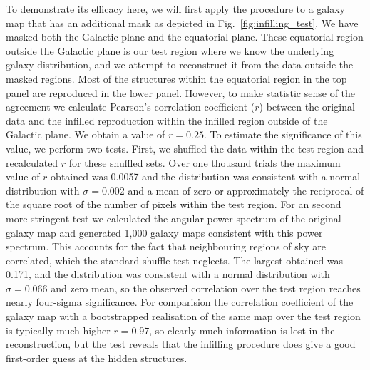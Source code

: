 \documentclass[useAMS,usenatbib]{mn2e}
\begin{document}
To demonstrate its efficacy here, we will first apply the procedure to
a galaxy map that has an additional mask as depicted in
Fig.~\ref{fig:infilling_test}.  We have masked both the Galactic plane
and the equatorial plane.  These equatorial region outside the
Galactic plane is our test region where we know the underlying galaxy
distribution, and we attempt to reconstruct it from the data outside
the masked regions.  Most of the structures within the equatorial
region in the top panel are reproduced in the lower panel.  However,
to make statistic sense of the agreement we calculate Pearson's
correlation coefficient ($r$) between the original data and the
infilled reproduction within the infilled region outside of the
Galactic plane.  We obtain a value of $r=0.25$.  To estimate the
significance of this value, we perform two tests.  First, we shuffled
the data within the test region and recalculated $r$ for these
shuffled sets.  Over one thousand trials the maximum value of $r$
obtained was 0.0057 and the distribution was consistent with a normal
distribution with $\sigma=0.002$ and a mean of zero or approximately
the reciprocal of the square root of the number of pixels within the
test region.  For an second more stringent test we calculated the
angular power spectrum of the original galaxy map and generated 1,000
galaxy maps consistent with this power spectrum.  This accounts for
the fact that neighbouring regions of sky are correlated, which the
standard shuffle test neglects.  The largest obtained was 0.171, and
the distribution was consistent with a normal distribution with
$\sigma=0.066$ and zero mean, so the observed correlation over the
test region reaches nearly four-sigma significance.  For comparision
the correlation coefficient of the galaxy map with a bootstrapped
realisation of the same map over the test region is typically much
higher $r=0.97$, so clearly much information is lost in the
reconstruction, but the test reveals that the infilling procedure does
give a good first-order guess at the hidden structures.
\end{document}
